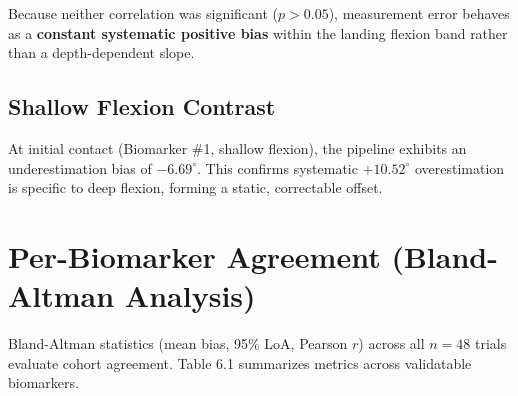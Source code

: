 Because neither correlation was significant ($p > 0.05$), measurement error behaves as a \textbf{constant systematic positive bias} within the landing flexion band rather than a depth-dependent slope.

\subsection{Shallow Flexion Contrast}
\label{sec:6-2-3-shallow-flexion-contrast}

At initial contact (Biomarker \protect\#1, shallow flexion), the pipeline exhibits an underestimation bias of \textbf{$-6.69^\circ$}. This confirms systematic $+10.52^\circ$ overestimation is specific to deep flexion, forming a static, correctable offset.



\section{Per-Biomarker Agreement (Bland-Altman Analysis)}
\label{sec:6-3-per-biomarker-agreement-bland-altman-analysis}


Bland-Altman statistics (mean bias, 95\% LoA, Pearson $r$) across all $n = 48$ trials evaluate cohort agreement. Table 6.1 summarizes metrics across validatable biomarkers.



